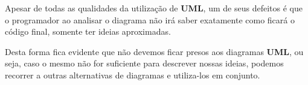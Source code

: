 \documentclass[a4paper, 12pt]{article}
\begin{document}
		Apesar de todas as qualidades da utilização de \textbf{UML}, um de seus defeitos é que o programador ao analisar o diagrama não irá saber exatamente como ficará o código final, somente ter ideias aproximadas.
		
		
		Desta forma fica evidente que não devemos ficar presos aos diagramas \textbf{UML}, ou seja, caso o mesmo não for suficiente para descrever nossas ideias, podemos recorrer a outras alternativas de diagramas e utiliza-los em conjunto.
		
		\nocite{*}
		\printbibliography
		
\end{document}
